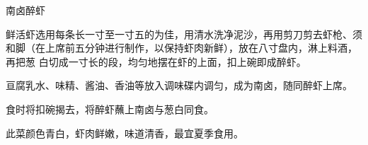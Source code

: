 %
%
%
%
%
%
%
\begin{recipe}{南卤醉虾}

\ingredients


\preparation

\step 鲜活虾选用每条长一寸至一寸五的为佳，用清水洗净泥沙，再用剪刀剪去虾枪、须
和脚（在上席前五分钟进行制作，以保持虾肉新鲜），放在八寸盘内，淋上料酒，再把葱
白切成一寸长的段，均匀地摆在虾的上面，扣上碗即成醉虾。

\step 亘腐乳水、味精、酱油、香油等放入调味碟内调匀，成为南卤，随同醉虾上席。

\step 食时将扣碗揭去，将醉虾蘸上南卤与葱白同食。

\features

此菜颜色青白，虾肉鲜嫩，味道清香，最宜夏季食用。

\end{recipe}

